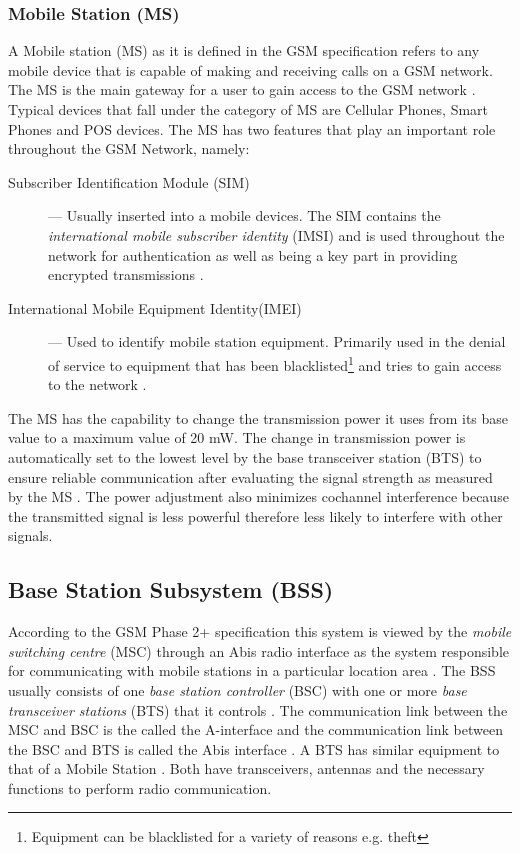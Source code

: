 \subsubsection{Mobile Station (MS)}
A Mobile station (MS) as it is defined in the GSM specification refers to any mobile device that is capable of making and receiving calls on a GSM network.  The MS is the main gateway 
for a user to gain access to the GSM network \cite{Eisenblatter,GSMArchitectureProtocolsServices}. Typical devices that fall under the category of MS are Cellular Phones, Smart Phones and POS devices. The MS has two features that play an important role throughout the GSM Network, namely:
\begin{description}
\item[Subscriber Identification Module (SIM)] --- Usually inserted into a mobile devices. The SIM contains the \emph{international mobile subscriber identity} (IMSI) and is used throughout the network for authentication as well as being a key part in providing encrypted transmissions \cite{Eisenblatter}.
\item[International Mobile Equipment Identity(IMEI)] --- Used to identify mobile station equipment. Primarily used in the denial of service to equipment that has been blacklisted\footnote{Equipment can be blacklisted for a variety of reasons e.g. theft} and tries to gain access to the network \cite{Eisenblatter}.
\end{description}
The MS has the capability to change the transmission power it uses from its base value to a maximum value of 20 mW. The change in transmission power is automatically set to the lowest level by the base transceiver station (BTS) to ensure reliable communication after evaluating the signal strength as measured by the MS \cite{GSMSysEngin,GSMArchitectureProtocolsServices}. The power adjustment also minimizes cochannel interference because the transmitted signal is less powerful therefore less likely to interfere with other signals\cite{GSMSysEngin}.

\subsection{Base Station Subsystem (BSS)}

According to the GSM Phase 2+ specification this system is viewed by the \emph{mobile switching centre} (MSC) through an Abis radio interface as the system responsible for communicating with mobile stations in a particular location area \cite{Eisenblatter}. The BSS usually consists of one \emph{base station controller} (BSC) with one or more \emph{base transceiver stations} (BTS) that it controls \cite{Eisenblatter}. The communication link between the MSC and BSC is the called the A-interface and the communication link between the BSC and BTS is called the Abis interface \cite{Eisenblatter}. A BTS has similar equipment to that of a Mobile Station \cite{GSMSysEngin}. Both have transceivers, antennas and the necessary functions to perform radio communication. 

